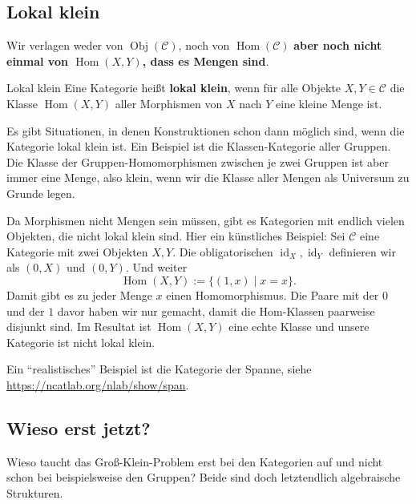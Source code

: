 \documentclass[a4paper]{amsart}
\theoremstyle{definition}
\DeclareMathOperator{\id}{id}
\DeclareMathOperator{\Hom}{Hom}
\newcommand{\CC}{\ensuremath{\mathcal{ C }}}
\begin{document}
\subsection{Lokal klein}
Wir verlagen weder von $\operatorname{Obj}(\CC)$, noch von $\Hom(\CC)$ \textbf{aber noch nicht einmal von $\Hom(X,Y)$, dass es Mengen sind}.
\begin{Definition}{Lokal klein}
   Eine Kategorie heißt \textbf{lokal klein}, wenn für alle Objekte $X,Y \in \CC$ die Klasse $\Hom(X,Y)$ aller Morphismen von $X$ nach $Y$ eine kleine Menge ist.
\end{Definition}
Es gibt Situationen, in denen Konstruktionen schon dann möglich sind, wenn die Kategorie lokal klein ist. Ein Beispiel ist die Klassen-Kategorie aller Gruppen. Die Klasse der Gruppen-Homomorphismen zwischen je zwei Gruppen ist aber immer eine Menge, also klein, wenn wir die Klasse aller Mengen als Universum zu Grunde legen.

Da Morphismen nicht Mengen sein müssen, gibt es Kategorien mit endlich vielen Objekten, die nicht lokal klein sind. Hier ein künstliches Beispiel: Sei $\CC$ eine Kategorie mit zwei Objekten $X, Y$. Die obligatorischen $\id_X, \id_Y$ definieren wir als $(0, X)$ und $(0, Y)$. Und weiter
\begin{equation}
   \Hom(X, Y) := \{ (1,x) \mid x = x \}. 
\end{equation}
Damit gibt es zu jeder Menge $x$ einen Homomorphismus. Die Paare mit der $0$ und der $1$ davor haben wir nur gemacht, damit die Hom-Klassen paarweise disjunkt sind. Im Resultat ist $\Hom(X, Y)$ eine echte Klasse und unsere Kategorie ist nicht lokal klein.

Ein "`realistisches"' Beispiel ist die Kategorie der Spanne, siehe \url{https://ncatlab.org/nlab/show/span}.

\subsection{Wieso erst jetzt?}
Wieso taucht das Groß-Klein-Problem erst bei den Kategorien auf und nicht schon bei beispielsweise den Gruppen? Beide sind doch letztendlich algebraische Strukturen.
\end{document}

